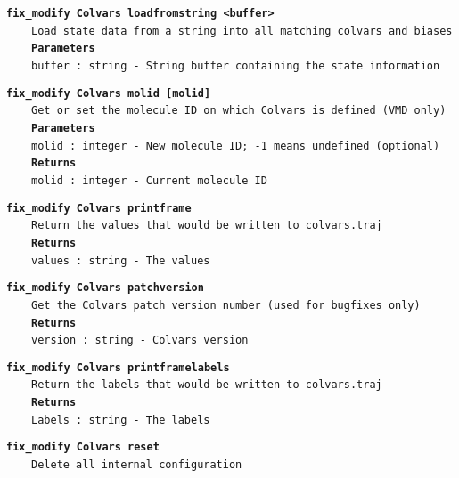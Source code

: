 \begin{mdexampleinput}{}
\texttt{\textbf{fix\_modify Colvars loadfromstring <buffer>}}
\\
\-~~~~\texttt{Load state data from a string into all matching colvars and biases}
\\
\-~~~~\texttt{\textbf{Parameters}}
\\
\-~~~~\texttt{buffer : string - String buffer containing the state information}
\end{mdexampleinput}
\begin{mdexampleinput}{}
\texttt{\textbf{fix\_modify Colvars molid [molid]}}
\\
\-~~~~\texttt{Get or set the molecule ID on which Colvars is defined (VMD only)}
\\
\-~~~~\texttt{\textbf{Parameters}}
\\
\-~~~~\texttt{molid : integer - New molecule ID; -1 means undefined (optional)}
\\
\-~~~~\texttt{\textbf{Returns}}
\\
\-~~~~\texttt{molid : integer - Current molecule ID}
\end{mdexampleinput}
\begin{mdexampleinput}{}
\texttt{\textbf{fix\_modify Colvars printframe}}
\\
\-~~~~\texttt{Return the values that would be written to colvars.traj}
\\
\-~~~~\texttt{\textbf{Returns}}
\\
\-~~~~\texttt{values : string - The values}
\end{mdexampleinput}
\begin{mdexampleinput}{}
\texttt{\textbf{fix\_modify Colvars patchversion}}
\\
\-~~~~\texttt{Get the Colvars patch version number (used for bugfixes only)}
\\
\-~~~~\texttt{\textbf{Returns}}
\\
\-~~~~\texttt{version : string - Colvars version}
\end{mdexampleinput}
\begin{mdexampleinput}{}
\texttt{\textbf{fix\_modify Colvars printframelabels}}
\\
\-~~~~\texttt{Return the labels that would be written to colvars.traj}
\\
\-~~~~\texttt{\textbf{Returns}}
\\
\-~~~~\texttt{Labels : string - The labels}
\end{mdexampleinput}
\begin{mdexampleinput}{}
\texttt{\textbf{fix\_modify Colvars reset}}
\\
\-~~~~\texttt{Delete all internal configuration}
\end{mdexampleinput}

